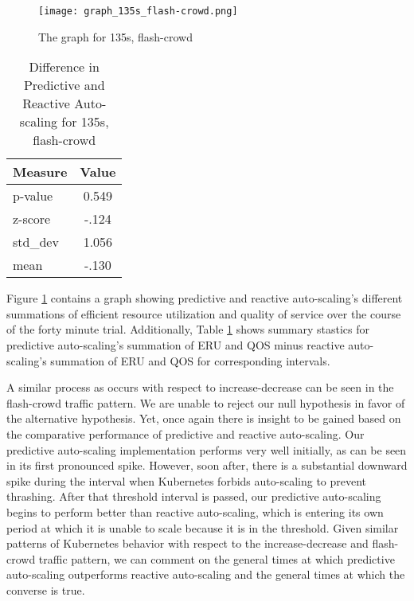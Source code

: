 \begin{figure}[!h]
  \centerline{\texttt{[image: graph\_135s\_flash-crowd.png]}}
  \caption{The graph for 135s, flash-crowd}
  \label{fig:135s-flash-crowd}
\end{figure}

\begin{table}[htbp]
  \centering
  \caption{Difference in Predictive and Reactive Auto-scaling for 135s, flash-crowd}
  \label{tab:135s-flash-crowd}
\begin{tabular}{l c}\hline\hline
    \multicolumn{1}{c}{\textbf{Measure}} & \textbf{Value} \\ \hline
     p-value & 0.549 \\
     z-score & -.124 \\
     std\_dev & 1.056 \\
     mean & -.130
  \end{tabular}
\end{table}

Figure \ref{fig:135s-flash-crowd} contains a graph
showing predictive and reactive auto-scaling's different
summations of efficient resource utilization and quality of service over the
course of the forty minute trial. Additionally, Table
\ref{tab:135s-flash-crowd} shows summary stastics for predictive
auto-scaling's summation of ERU and QOS minus reactive auto-scaling's summation
of ERU and QOS for corresponding intervals.

A similar process as occurs with respect to increase-decrease can be seen in the
flash-crowd traffic pattern. We are unable to reject our null hypothesis in
favor of the alternative hypothesis. Yet, once again there is insight to be
gained based on the comparative performance of predictive and reactive
auto-scaling. Our predictive auto-scaling implementation performs
very well initially, as can be seen in its first pronounced spike. However, soon
after, there is a substantial downward spike during the interval when Kubernetes
forbids auto-scaling to prevent thrashing. After that threshold interval is
passed, our predictive auto-scaling begins to perform better than reactive
auto-scaling, which is entering its own period at which it is unable to scale
because it is in the threshold. Given similar patterns of Kubernetes behavior
with respect to the increase-decrease and flash-crowd traffic pattern, we can
comment on the general times at which predictive auto-scaling outperforms
reactive auto-scaling and the general times at which the converse is true.
